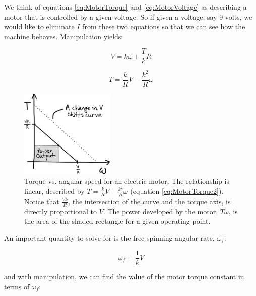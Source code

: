 We think of equations \ref{eq:MotorTorque} and \ref{eq:MotorVoltage} as describing a motor that is controlled by a given voltage. So if given a voltage, say 9 volts, we would like to eliminate $I$ from these two equations so that we can see how the machine behaves. Manipulation yields:

\begin{equation}
V = k\omega + \frac{T}{k}R
\label{eq:MotorVoltage2}
\end{equation}

\begin{equation}
T = \frac{k}{R}V - \frac{k^2}{R}\omega
\label{eq:MotorTorque2}
\end{equation}

\begin{figure}[h]		%
\begin{centering}
\includegraphics[width=0.4\textwidth]{Figures/MotorTorqueCurveSketch}\par
\end{centering}
\caption[Plot: Torque vs. Angular Speed for an Electric Motor]{Torque vs. angular speed for an electric motor. The relationship is linear, described by $T = \frac{k}{R}V - \frac{k^2}{R}\omega$ (equation \ref{eq:MotorTorque2}). Notice that $\frac{Vk}{R}$, the intersection of the curve and the torque axis, is directly proportional to $V$. The power developed by the motor, $T\omega$, is the area of the shaded rectangle for a given operating point.}
\label{fig:MotorTorqueCurveSketch}
\end{figure}
%

An important quantity to solve for is the free spinning angular rate, $\omega_{f}$:

\begin{equation}
\omega_{f} = \frac{1}{k}V
\label{eq:FreeSpinningOmega}
\end{equation}

and with manipulation, we can find the value of the motor torque constant in terms of $\omega_{f}$:

